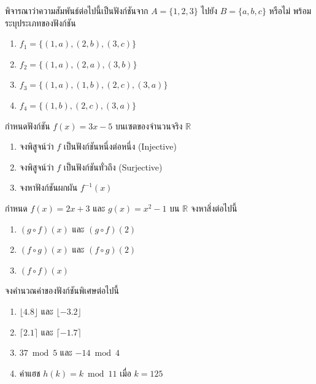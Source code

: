 \begin{exercise}
พิจารณาว่าความสัมพันธ์ต่อไปนี้เป็นฟังก์ชันจาก $A = \{1, 2, 3\}$ ไปยัง $B = \{a, b, c\}$ หรือไม่ พร้อมระบุประเภทของฟังก์ชัน
\begin{enumerate}
    \item $f_1 = \{(1,a), (2,b), (3,c)\}$
    \item $f_2 = \{(1,a), (2,a), (3,b)\}$
    \item $f_3 = \{(1,a), (1,b), (2,c), (3,a)\}$
    \item $f_4 = \{(1,b), (2,c), (3,a)\}$
\end{enumerate}
\end{exercise}

\begin{exercise}
กำหนดฟังก์ชัน $f(x) = 3x - 5$ บนเซตของจำนวนจริง $\mathbb{R}$
\begin{enumerate}
    \item จงพิสูจน์ว่า $f$ เป็นฟังก์ชันหนึ่งต่อหนึ่ง (Injective)
    \item จงพิสูจน์ว่า $f$ เป็นฟังก์ชันทั่วถึง (Surjective)
    \item จงหาฟังก์ชันผกผัน $f^{-1}(x)$
\end{enumerate}
\end{exercise}

\begin{exercise}
กำหนด $f(x) = 2x + 3$ และ $g(x) = x^2 - 1$ บน $\mathbb{R}$ จงหาสิ่งต่อไปนี้
\begin{enumerate}
    \item $(g \circ f)(x)$ และ $(g \circ f)(2)$
    \item $(f \circ g)(x)$ และ $(f \circ g)(2)$
    \item $(f \circ f)(x)$
\end{enumerate}
\end{exercise}

\begin{exercise}
จงคำนวณค่าของฟังก์ชันพิเศษต่อไปนี้
\begin{enumerate}
    \item $\lfloor 4.8 \rfloor$ และ $\lfloor -3.2 \rfloor$
    \item $\lceil 2.1 \rceil$ และ $\lceil -1.7 \rceil$
    \item $37 \bmod 5$ และ $-14 \bmod 4$
    \item ค่าแฮช $h(k) = k \bmod 11$ เมื่อ $k = 125$
\end{enumerate}
\end{exercise}

